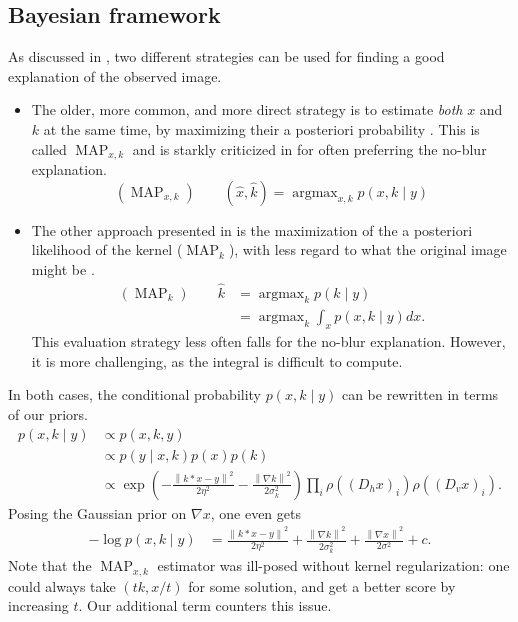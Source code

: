 \documentclass[english,a4paper]{article}
\theoremstyle{plain}
\theoremstyle{definition}
\theoremstyle{remark}
\DeclareMathOperator*{\argmax}{argmax}
\DeclareMathOperator{\MAP}{MAP}
\newcommand{\norm}[1]{\left\lVert #1 \right\rVert}
\begin{document}
\subsection{Bayesian framework}
As discussed in \cite{levin2009understanding,levin2011efficient}, two different strategies can be used for finding a good explanation of the observed image.
\begin{itemize}
	\item The older, more common, and more direct strategy is to estimate \emph{both} $x$ and $k$ at the same time, by maximizing their a posteriori probability \cite{cho2009fast,cho2007removing,jia2007single,shan2008high,xu2010two}.
	This is called $\MAP_{x,k}$ and is starkly criticized in  \cite{levin2011efficient,levin2009understanding} for often preferring the no-blur explanation.
	\begin{equation}\label{eq:MAP_xk}
	(\MAP_{x,k}) \quad\quad (\hat{x},\hat{k}) = \argmax_{x,k} p(x,k \mid y)
	\end{equation}
	\item The other approach presented in \cite{levin2009understanding} is the maximization of the a posteriori likelihood of the kernel ($\MAP_k$), with less regard to what the original image might be \cite{fergus2006removing,whyte2012non}.
	\begin{align}\label{eq:MAP_k}
	(\MAP_k) \quad\quad \hat{k} &= \argmax_{k} p(k \mid y)\\
	&= \argmax_{k} \int_x p(x,k \mid y) dx \nonumber .
	\end{align}
	This evaluation strategy less often falls for the no-blur explanation. However, it is more challenging, as the integral is difficult to compute.
\end{itemize}

In both cases, the conditional probability $p(x,k \mid y)$ can be rewritten in terms of our priors.
\begin{align*}
p(x,k \mid y) &\propto p(x,k,y)\\
&\propto p(y \mid x,k) p(x) p(k)\\
&\propto \exp\left( -\frac{\norm{k*x-y}^2}{2\eta^2} - \frac{\norm{\nabla k}^2}{2 \sigma_k^2}  \right) \prod_i \rho((D_h x)_i) \rho((D_v x)_i) .
\end{align*}
Posing the Gaussian prior on $\nabla x$, one even gets
\begin{align*}
-\log p(x,k \mid y) &= \frac{\norm{k*x-y}^2}{2\eta^2} + \frac{\norm{\nabla k}^2}{2 \sigma_k^2} + \frac{\norm{\nabla x}^2}{2\sigma^2} + c .
\end{align*}
Note that the $\MAP_{x,k}$ estimator was ill-posed without kernel regularization: one could always take $(tk,x/t)$ for some solution, and get a better score by increasing $t$.
Our additional term counters this issue.
\end{document}
